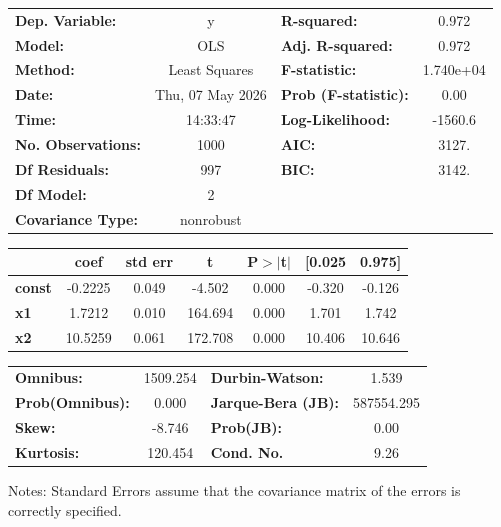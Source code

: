 \begin{center}
\begin{tabular}{lclc}
\toprule
\textbf{Dep. Variable:}    &        y         & \textbf{  R-squared:         } &     0.972   \\
\textbf{Model:}            &       OLS        & \textbf{  Adj. R-squared:    } &     0.972   \\
\textbf{Method:}           &  Least Squares   & \textbf{  F-statistic:       } & 1.740e+04   \\
\textbf{Date:}             & Thu, 07 May 2026 & \textbf{  Prob (F-statistic):} &     0.00    \\
\textbf{Time:}             &     14:33:47     & \textbf{  Log-Likelihood:    } &   -1560.6   \\
\textbf{No. Observations:} &        1000      & \textbf{  AIC:               } &     3127.   \\
\textbf{Df Residuals:}     &         997      & \textbf{  BIC:               } &     3142.   \\
\textbf{Df Model:}         &           2      & \textbf{                     } &             \\
\textbf{Covariance Type:}  &    nonrobust     & \textbf{                     } &             \\
\bottomrule
\end{tabular}
\begin{tabular}{lcccccc}
               & \textbf{coef} & \textbf{std err} & \textbf{t} & \textbf{P$> |$t$|$} & \textbf{[0.025} & \textbf{0.975]}  \\
\midrule
\textbf{const} &      -0.2225  &        0.049     &    -4.502  &         0.000        &       -0.320    &       -0.126     \\
\textbf{x1}    &       1.7212  &        0.010     &   164.694  &         0.000        &        1.701    &        1.742     \\
\textbf{x2}    &      10.5259  &        0.061     &   172.708  &         0.000        &       10.406    &       10.646     \\
\bottomrule
\end{tabular}
\begin{tabular}{lclc}
\textbf{Omnibus:}       & 1509.254 & \textbf{  Durbin-Watson:     } &     1.539   \\
\textbf{Prob(Omnibus):} &   0.000  & \textbf{  Jarque-Bera (JB):  } & 587554.295  \\
\textbf{Skew:}          &  -8.746  & \textbf{  Prob(JB):          } &      0.00   \\
\textbf{Kurtosis:}      & 120.454  & \textbf{  Cond. No.          } &      9.26   \\
\bottomrule
\end{tabular}
\end{center}

Notes: \newline
 [1] Standard Errors assume that the covariance matrix of the errors is correctly specified.